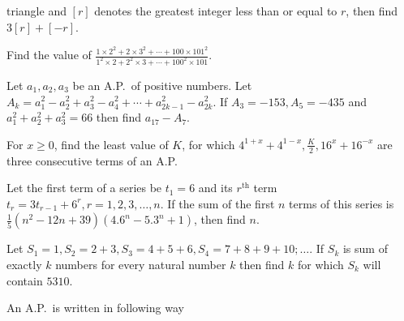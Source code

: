   triangle and $[r]$ denotes the greatest integer less than or equal to $r$, then find $3[r] + [-r]$.
\item Find the value of $\frac{1\times2^2 + 2\times3^2 + \cdots + 100\times101^2}{1^2\times2 + 2^2\times3 +
  \cdots + 100^2\times101}$.
\item Let $a_1, a_2, a_3$ be an A.P.\ of positive numbers. Let $A_k = a_1^2 - a_2^2 + a_3^2 - a_4^2 + \cdots
  + a_{2k - 1}^2 - a_{2k}^2$. If $A_3 = -153, A_5 = -435$ and $a_1^2 + a_2^2 + a_3^2 = 66$ then find $a_{17}
  - A_7$.
\item For $x\geq 0$, find the least value of $K$, for which $4^{1 + x} + 4^{1 - x}, \frac{K}{2}, 16^x +
  16^{-x}$ are three consecutive terms of an A.P.
\item Let the first term of a series be $t_1 = 6$ and its $r^{\mathrm{th}}$ term $t_r = 3t_{r - 1} + 6^r, r
  = 1, 2, 3, \ldots, n$. If the sum of the first $n$ terms of this series is $\frac{1}{5}(n^2 - 12n +
  39)(4.6^n - 5.3^n + 1)$, then find $n$.
\item Let $S_1 = 1, S_2 = 2 + 3, S_3 = 4 + 5 + 6, S_4 = 7 + 8 + 9 + 10; \ldots$. If $S_k$ is sum of exactly
  $k$ numbers for every natural number $k$ then find $k$ for which $S_k$ will contain $5310$.
\item An A.P.\ is written in following way

  \startformula\startalign[n=7]
  \NC\NC\NC{}\NC\NC\NC\NR
  \NC\NC{}\NC{}\NC\NC\NR
  \NC{}\NC{}\NC{}\NC\NR
  \NC{}\NC{}\NC{}\NR
  \NC\NC\NC\NC\cdots\NC\NC\NC\NR
  \stopalign\stopformula

